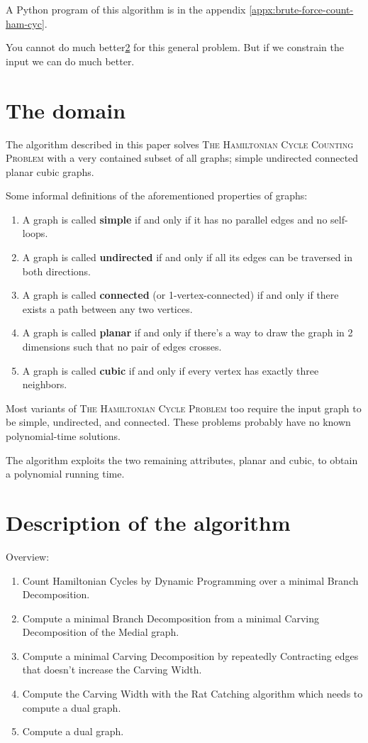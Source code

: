 \documentclass{article}
\begin{document}
	A Python program of this algorithm is in the appendix \ref{appx:brute-force-count-ham-cyc}.

	You cannot do much better\ref{} for this general problem. But if we constrain the input we can do much better.

\section{The domain}
	The algorithm described in this paper solves \textsc{The Hamiltonian Cycle Counting Problem} with a very contained subset of all graphs; simple undirected connected planar cubic graphs.

	Some informal definitions of the aforementioned properties of graphs:

	\begin{enumerate}
		\item A graph is called \textbf{simple} if and only if it has no parallel edges and no self-loops.
		\item A graph is called \textbf{undirected} if and only if all its edges can be traversed in both directions.
		\item A graph is called \textbf{connected} (or 1-vertex-connected) if and only if there exists a path between any two vertices.
		\item A graph is called \textbf{planar} if and only if there's a way to draw the graph in 2 dimensions such that no pair of edges crosses.
		\item A graph is called \textbf{cubic} if and only if every vertex has exactly three neighbors.
	\end{enumerate}

	Most variants of \textsc{The Hamiltonian Cycle Problem} too require the input graph to be simple, undirected, and connected. These problems probably have no known polynomial-time solutions.

	The algorithm exploits the two remaining attributes, planar and cubic, to obtain a polynomial running time.

\section{Description of the algorithm}

	Overview:

	\begin{enumerate}
		\item Count Hamiltonian Cycles by Dynamic Programming over a minimal Branch Decomposition.
		\item Compute a minimal Branch Decomposition from a minimal Carving Decomposition of the Medial graph.
		\item Compute a minimal Carving Decomposition by repeatedly Contracting edges that doesn't increase the Carving Width.
		\item Compute the Carving Width with the Rat Catching algorithm which needs to compute a dual graph.
		\item Compute a dual graph.
	\end{enumerate}
\end{document}
